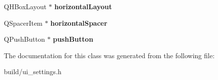 \begin{DoxyCompactItemize}
\item 
\hypertarget{class_ui___settings_a9d6c3374d5c8e77c7562893064dae659}{}Q\+H\+Box\+Layout $\ast$ {\bfseries horizontal\+Layout}\label{class_ui___settings_a9d6c3374d5c8e77c7562893064dae659}

\item 
\hypertarget{class_ui___settings_aaeaa7220cec5d109b8fba9edfedb9a5e}{}Q\+Spacer\+Item $\ast$ {\bfseries horizontal\+Spacer}\label{class_ui___settings_aaeaa7220cec5d109b8fba9edfedb9a5e}

\item 
\hypertarget{class_ui___settings_a2f52bbf528849be5c79e453e2bf1c0a3}{}Q\+Push\+Button $\ast$ {\bfseries push\+Button}\label{class_ui___settings_a2f52bbf528849be5c79e453e2bf1c0a3}

\end{DoxyCompactItemize}


The documentation for this class was generated from the following file\+:\begin{DoxyCompactItemize}
\item 
build/ui\+\_\+settings.\+h\end{DoxyCompactItemize}
